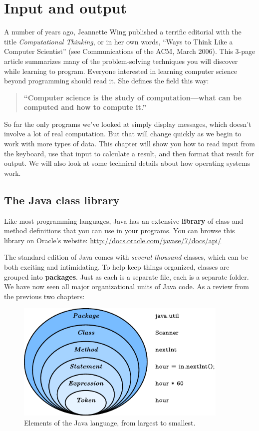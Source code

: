 \chapter{Input and output}

A number of years ago, Jeannette Wing published a terrific editorial with the title {\it Computational Thinking}, or in her own words, ``Ways to Think Like a Computer Scientist'' (see Communications of the ACM, March 2006).
This 3-page article summarizes many of the problem-solving techniques you will discover while learning to program.
Everyone interested in learning computer science beyond programming should read it.
She defines the field this way:


\begin{quote}
{\bf ``Computer science is the study of computation---what can be computed and how to compute it.''}
\end{quote}

So far the only programs we've looked at simply display messages, which doesn't involve a lot of real computation.
But that will change quickly as we begin to work with more types of data.
This chapter will show you how to read input from the keyboard, use that input to calculate a result, and then format that result for output.
We will also look at some technical details about how operating systems work.


\section{The Java class library}


Like most programming languages, Java has an extensive {\bf library} of class and method definitions that you can use in your programs.
You can browse this library on Oracle's website:
\url{http://docs.oracle.com/javase/7/docs/api/}


The standard edition of Java comes with {\em several thousand} classes, which can be both exciting and intimidating.
To help keep things organized, classes are grouped into {\bf packages}.
Just as each  is a separate file, each  is a separate folder.
We have now seen all major organizational units of Java code.
As a review from the previous two chapters:

\begin{figure}[!h]
\includegraphics[width=4in]{package.pdf}
\caption{Elements of the Java language, from largest to smallest.}
\end{figure}

